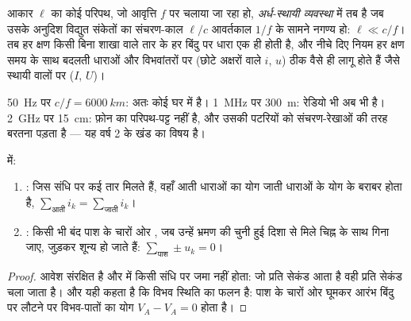 \begin{definition}\label{def:b1:dc-circuits:arqs}
आकार $\ell$ का कोई परिपथ, जो आवृत्ति $f$ पर चलाया जा रहा हो,
\emph{अर्ध-स्थायी व्यवस्था} में तब है जब उसके अनुदिश विद्युत संकेतों का
संचरण-काल $\ell/c$ आवर्तकाल $1/f$ के सामने नगण्य हो:
$\ell \ll c/f$। तब हर क्षण किसी बिना शाखा वाले तार के हर बिंदु पर धारा एक ही
होती है, और नीचे दिए नियम हर क्षण समय के साथ बदलती धाराओं और विभवांतरों पर
(छोटे अक्षरों वाले $i$, $u$) ठीक वैसे ही लागू होते हैं जैसे स्थायी वालों पर
($I$, $U$)।
\end{definition}

\begin{example}[अर्ध कितना अर्ध है]\label{ex:b1:dc-circuits:arqs}
\qty{50}{Hz} पर $c/f = \qty{6000}{km}$: अतः कोई घर  में है। \qty{1}{MHz} पर \qty{300}{m}: रेडियो भी अब भी है।
\qty{2}{GHz} पर \qty{15}{cm}: फ़ोन का परिपथ-पट्ट नहीं है, और उसकी पटरियों को
संचरण-रेखाओं की तरह बरतना पड़ता है --- यह वर्ष 2 के खंड का विषय है।
\end{example}

\begin{theorem}[किरचॉफ़ के नियम]\label{thm:b1:dc-circuits:kirchhoff}
 में:
\begin{enumerate}
  \item \emph{}: जिस संधि पर कई तार मिलते हैं, वहाँ आती धाराओं का
        योग जाती धाराओं के योग के बराबर होता है,
        $\sum_{\text{आती}} i_k = \sum_{\text{जाती}} i_k$।
  \item \emph{}: किसी भी बंद पाश के चारों ओर , जब उन्हें
        भ्रमण की चुनी हुई दिशा से मिले चिह्न के साथ गिना जाए, जुड़कर शून्य हो
        जाते हैं: $\sum_{\text{पाश}} \pm u_k = 0$।
\end{enumerate}
\end{theorem}

\begin{proof}
आवेश संरक्षित है और  में किसी संधि पर जमा नहीं होता: जो
प्रति सेकंड आता है वही प्रति सेकंड चला जाता है। और  यही कहता है कि
विभव स्थिति का फलन है: पाश के चारों ओर घूमकर आरंभ बिंदु पर लौटने पर विभव-पातों
का योग $V_A - V_A = 0$ होता है।
\end{proof}


